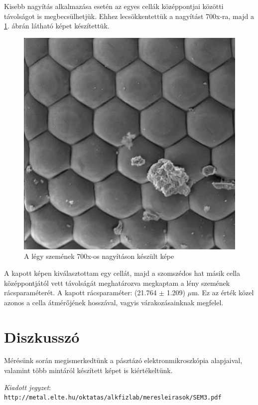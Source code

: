 \documentclass[12pt,a4paper]{article}
\begin{document}
\newpage
\hspace*{10pt} Kisebb nagyítás alkalmazása esetén az egyes cellák középpontjai közötti távolságot is megbecsülhetjük. Ehhez lecsökkentettük a nagyítást 700x-ra, majd a \ref{fig:legy_kicsi}. ábrán látható képet készítettük.\\
\begin{figure}[!h]
\centering
\includegraphics[width=0.8\linewidth]{E/E/015_s}
\caption{A légy szemének 700x-os nagyításon készült képe}
\label{fig:legy_kicsi}
\end{figure}
\newline
A kapott képen kiválasztottam egy cellát, majd a szomszédos hat másik cella középpontjától vett távolságát meghatározva megkaptam a lény szemének rácsparaméterét. A kapott rácsparaméter: (21.764 $\pm$ 1.209) $\mu$m. Ez az érték közel azonos a cella átmérőjének hosszával, vagyis várakozásainknak megfelel.

\section{Diszkusszó}
\hspace*{10pt} Mérésünk során megismerkedtünk a pásztázó elektronmikroszkópia alapjaival, valamint több mintáról készített képet is kiértékeltünk.

\begin{thebibliography}{99}

 \emph{Kiadott jegyzet}:\\
\texttt{http://metal.elte.hu/oktatas/alkfizlab/meresleirasok/SEM3.pdf}

\end{thebibliography}
\end{document}
